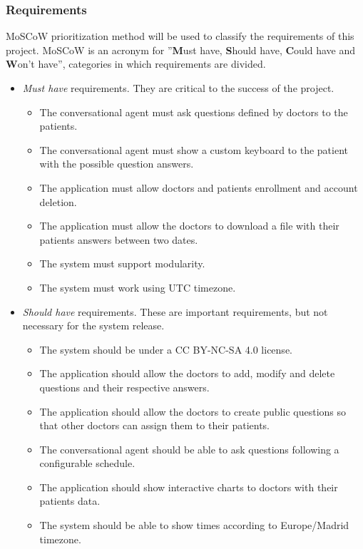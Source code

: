 \documentclass[12pt,english]{article}
\begin{document}
\subsubsection{Requirements}
MoSCoW prioritization method \cite{moscow} will be used to classify the requirements of this project. MoSCoW is an acronym for ''\textbf{M}ust have, \textbf{S}hould have, \textbf{C}ould have and \textbf{W}on't have'', categories in which requirements are divided.
\begin{itemize}
  \item \emph{Must have} requirements. They are critical to the success of the project.
    \begin{itemize}
      \item The conversational agent must ask questions defined by doctors to the patients.
      \item The conversational agent must show a custom keyboard to the patient with the possible question answers.
      \item The application must allow doctors and patients enrollment and account deletion.
      \item The application must allow the doctors to download a file with their patients answers between two dates.
      \item The system must support modularity.
      \item The system must work using UTC timezone.
    \end{itemize}
  \item \emph{Should have} requirements. These are important requirements, but not necessary for  the system release.
    \begin{itemize}
      \item The system should be under a CC BY-NC-SA 4.0 \cite{CC} license.
      \item The application should allow the doctors to add, modify and delete questions and their respective answers.
      \item The application should allow the doctors to create public questions so that other doctors can assign them to their patients.
      \item The conversational agent should be able to ask questions following a configurable schedule.
      \item The application should show interactive charts to doctors with their patients data.
      \item The system should be able to show times according to Europe/Madrid timezone.
    \end{itemize}

\end{itemize}
\end{document}
